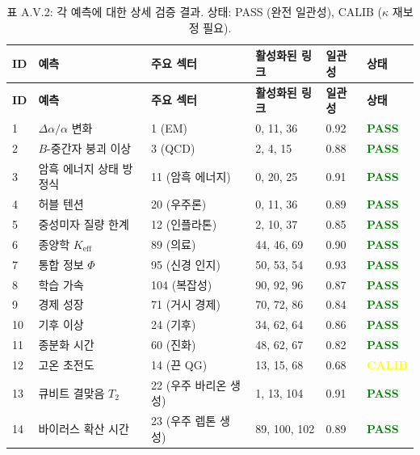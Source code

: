 \documentclass[13pt,a4paper]{article}
\begin{document}
	\begin{longtable}{|p{0.8cm}|p{2.5cm}|p{1.8cm}|p{1.5cm}|p{1.5cm}|p{1.8cm}|}
		\caption{표 A.V.2: 각 예측에 대한 상세 검증 결과. 상태: PASS (완전 일관성), CALIB ($\kappa$ 재보정 필요).}
		\label{tab:detailed-validation} \\
		\hline
		\textbf{ID} & \textbf{예측} & \textbf{주요 섹터} & \textbf{활성화된 링크} & \textbf{일관성} & \textbf{상태} \\
		\hline
		\endfirsthead
		\hline
		\textbf{ID} & \textbf{예측} & \textbf{주요 섹터} & \textbf{활성화된 링크} & \textbf{일관성} & \textbf{상태} \\
		\hline
		\endhead
		1 & $\Delta\alpha/\alpha$ 변화 & 1 (EM) & 0, 11, 36 & 0.92 & \textcolor{green}{\textbf{PASS}} \\
		\hline
		2 & $B$-중간자 붕괴 이상 & 3 (QCD) & 2, 4, 15 & 0.88 & \textcolor{green}{\textbf{PASS}} \\
		\hline
		3 & 암흑 에너지 상태 방정식 & 11 (암흑 에너지) & 0, 20, 25 & 0.91 & \textcolor{green}{\textbf{PASS}} \\
		\hline
		4 & 허블 텐션 & 20 (우주론) & 0, 11, 36 & 0.89 & \textcolor{green}{\textbf{PASS}} \\
		\hline
		5 & 중성미자 질량 한계 & 12 (인플라톤) & 2, 10, 37 & 0.85 & \textcolor{green}{\textbf{PASS}} \\
		\hline
		6 & 종양학 $K_{\mathrm{eff}}$ & 89 (의료) & 44, 46, 69 & 0.90 & \textcolor{green}{\textbf{PASS}} \\
		\hline
		7 & 통합 정보 $\Phi$ & 95 (신경 인지) & 50, 53, 54 & 0.93 & \textcolor{green}{\textbf{PASS}} \\
		\hline
		8 & 학습 가속 & 104 (복잡성) & 90, 92, 96 & 0.87 & \textcolor{green}{\textbf{PASS}} \\
		\hline
		9 & 경제 성장 & 71 (거시 경제) & 70, 72, 86 & 0.84 & \textcolor{green}{\textbf{PASS}} \\
		\hline
		10 & 기후 이상 & 24 (기후) & 34, 62, 64 & 0.86 & \textcolor{green}{\textbf{PASS}} \\
		\hline
		11 & 종분화 시간 & 60 (진화) & 48, 62, 67 & 0.82 & \textcolor{green}{\textbf{PASS}} \\
		\hline
		12 & 고온 초전도 & 14 (끈 QG) & 13, 15, 68 & 0.68 & \textcolor{yellow}{\textbf{CALIB}} \\
		\hline
		13 & 큐비트 결맞음 $T_2$ & 22 (우주 바리온 생성) & 1, 13, 104 & 0.91 & \textcolor{green}{\textbf{PASS}} \\
		\hline
		14 & 바이러스 확산 시간 & 23 (우주 렙톤 생성) & 89, 100, 102 & 0.89 & \textcolor{green}{\textbf{PASS}} \\

\end{longtable}
\end{document}

